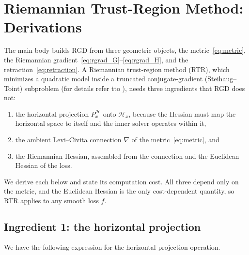 \documentclass[letterpaper, 10 pt, conference]{ieeeconf}
\newcommand{\cH}{\mathcal{H}}
\theoremstyle{plain}
\theoremstyle{definition}
\theoremstyle{remark}
\begin{document}
\section{Riemannian Trust-Region Method: Derivations}
\label{app:secondorder}
The main body builds RGD from three geometric objects, the metric~\eqref{eq:metric}, the Riemannian gradient~\eqref{eq:rgrad_G}--\eqref{eq:rgrad_H}, and the retraction~\eqref{eq:retraction}. A Riemannian trust-region method (RTR), which minimizes a quadratic model inside a truncated conjugate-gradient (Steihaug--Toint) subproblem (for details refer tto \citep{absilbook,boumal2023introduction}), needs three ingredients that RGD does not:
\begin{enumerate}[nosep,label=(\roman*)]
  \item the horizontal projection $P_x^{\cH}$ onto $\cH_x$, because the Hessian must map the horizontal space to itself and the inner solver operates within it,
  \item the ambient Levi--Civita connection $\nabla$ of the metric~\eqref{eq:metric}, and
  \item the Riemannian Hessian, assembled from the connection and the Euclidean Hessian of the loss.
\end{enumerate}
We derive each below and state its computation cost. All three depend only on the metric, and the Euclidean Hessian is the only cost-dependent quantity, so RTR applies to any smooth loss $f$.

\subsection{Ingredient 1: the horizontal projection}
We have the following expression for the horizontal projection operation.
\end{document}
